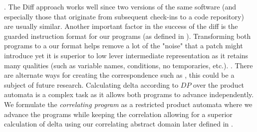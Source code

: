  . The Diff approach works well since two versions of the same software (and especially those that originate from subsequent check-ins to a code repository) are usually similar. Another important factor in the success of the diff is the guarded instruction format for our programs (as defined in ). Transforming both programs to a our format helps remove a lot of the "noise" that a patch might introduce yet it is superior to low lever intermediate representation as it retains many qualities (such as variable names, conditions, no temporaries, etc.). . There are alternate ways for creating the correspondence such as , this could be a subject of future research. Calculating delta according to $DP$ over the product automata is a complex task as it allows both programs to advance independently. We formulate the \emph{correlating program} as a restricted product automata where we advance the programs while keeping the correlation allowing for a superior calculation of delta using our correlating abstract domain later defined in .


